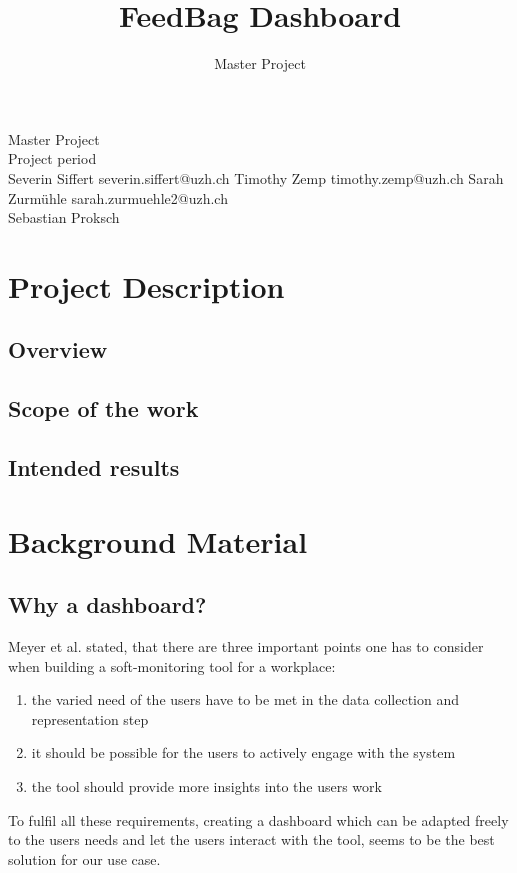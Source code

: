 \documentclass{seal_article}
\title{FeedBag Dashboard}
\subtitle{Master Project}
\begin{document}
\maketitle

\iftexshop
\setprotcode\font
{\it \setprotcode \font}
{\bf \setprotcode \font}
{\bf \it \setprotcode \font}
\fi

\noindent Master Project\\
\noindent Project period\\
\noindent Severin Siffert \newline severin.siffert@uzh.ch \newline Timothy Zemp \newline timothy.zemp@uzh.ch \newline Sarah Zurmühle \newline sarah.zurmuehle2@uzh.ch\\
\noindent Sebastian Proksch

\section{Project Description}

\subsection{Overview}
\subsection{Scope of the work}
\subsection{Intended results}


\section{Background Material}

\subsection{Why a dashboard?}
Meyer et al. \cite{Meyer:2017:DRS:3171581.3134714} stated, that there are three important points one has to consider when building a soft-monitoring tool for a workplace: 
\begin{enumerate}
	\item the varied need of the users have to be met in the data collection and representation step
	\item it should be possible for the users to actively engage with the system
	\item the tool should provide more insights into the users work
\end{enumerate}
To fulfil all these requirements, creating a dashboard which can be adapted freely to the users needs and let the users interact with the tool, seems to be the best solution for our use case. 
\end{document}
